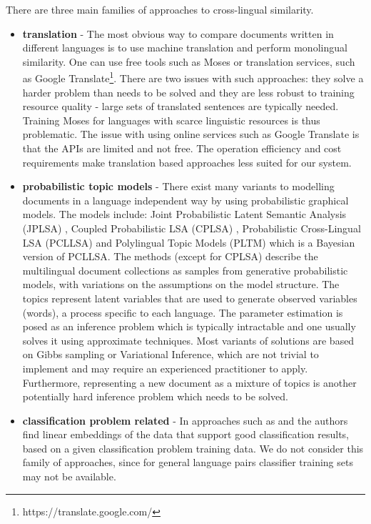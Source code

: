 \documentclass[twoside,11pt]{article}
\begin{document}
There are three main families of approaches to cross-lingual similarity.
\begin{itemize}
\item \textbf{translation} - The most obvious way to compare documents written in different languages is to use machine translation and perform monolingual similarity. One can use free tools such as Moses  or translation services, such as Google Translate\footnote{https://translate.google.com/}. There are two issues with such approaches: they solve a harder problem than needs to be solved and they are less robust to training resource quality - large sets of translated sentences are typically needed. Training Moses for languages with scarce linguistic resources is thus problematic. The issue with using online services such as Google Translate is that the APIs are limited and not free. The operation efficiency and cost requirements make translation based approaches less suited for our system.
\item \textbf{probabilistic topic models} -  There exist many variants to modelling documents in a language independent way by using probabilistic graphical models. The models include:  Joint Probabilistic Latent Semantic Analysis (JPLSA) , Coupled Probabilistic LSA (CPLSA) \cite{platt2010translingual}, Probabilistic Cross-Lingual LSA (PCLLSA)\cite{PCL_LSA} and Polylingual Topic Models (PLTM)  which is a Bayesian version of PCLLSA. The methods (except for CPLSA) describe the multilingual document collections as samples from generative probabilistic models, with variations on the assumptions on the model structure. The topics represent latent variables that are used to generate observed variables (words), a process specific to each language. The parameter estimation is posed as an inference problem which is typically intractable and one usually solves it using approximate techniques. Most variants of solutions are based on Gibbs sampling or Variational Inference, which are not trivial to implement and may require an experienced practitioner to apply. Furthermore, representing a new document as a mixture of topics is another potentially hard inference problem which needs to be solved.
\item \textbf{classification problem related} - In approaches such as \cite{cotrain} and  the authors find linear embeddings of the data that support good classification results, based on a given classification problem training data. We do not consider this family of approaches, since for general language pairs classifier training sets may not be available.

\end{itemize}
\end{document}

